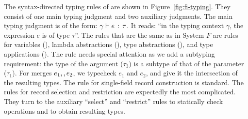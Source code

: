 The syntax-directed typing rules of \name are shown in Figure~\ref{fig:fi-typing}. They consist of one
main typing judgment and two auxiliary judgments. The main typing judgment is of
the form: $ \gamma \vdash e \ \!:\! \ \tau $. It reads: ``in the typing context
$\gamma$, the expression $e$ is of type $\tau$''. The rules that are the same as
in System $F$ are rules for variables (), lambda abstractions
(), type abstractions (), and type applications
(). The rule  needs special attention as we add
a subtyping requirement: the type of the argument ($\tau_3$) is a
subtype of that of the parameter ($\tau_1$).
For merges
$e_1 ,, e_2$, we typecheck $e_1$ and $e_2$, and give it the
intersection of the resulting types. The rule for
single-field record construction is standard. The rules
for record selection and restriction
are expectedly the most complicated. They turn to the
auxiliary ``select'' and ``restrict'' rules to statically check operations and
to obtain resulting types.

